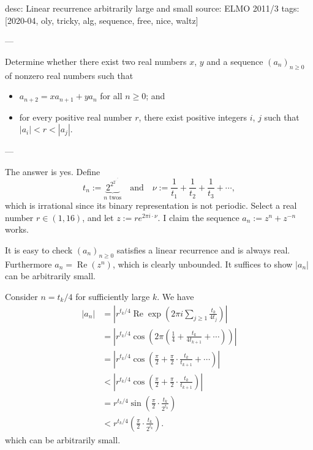 desc: Linear recurrence arbitrarily large and small
source: ELMO 2011/3
tags: [2020-04, oly, tricky, alg, sequence, free, nice, waltz]

---

Determine whether there exist two real numbers $x$, $y$ and a sequence $(a_n)_{n\ge0}$ of nonzero real numbers such that 
\begin{itemize}[itemsep=0em]
    \item $a_{n+2}=xa_{n+1}+ya_n$ for all $n\ge0$; and
    \item for every positive real number $r$, there exist positive integers $i$, $j$ such that $|a_i|<r<|a_j|$.
\end{itemize}

---

The answer is yes. Define \[t_n:=\underbrace{2^{2^{2^{\cdot^{\cdot^{\cdot^2}}}}}}_{n\text{ twos}}\quad\text{and}\quad\nu:=\frac1{t_1}+\frac1{t_2}+\frac1{t_3}+\cdots,\]
which is irrational since its binary representation is not periodic. Select a real number $r\in(1,16)$, and let $z:=re^{2\pi i\cdot\nu}$. I claim the sequence $a_n:=z^n+z^{-n}$ works.

It is easy to check $(a_n)_{n\ge0}$ satisfies a linear recurrence and is always real. Furthermore $a_n=\operatorname{Re}(z^n)$, which is clearly unbounded. It suffices to show $|a_n|$ can be arbitrarily small.

Consider $n=t_k/4$ for sufficiently large $k$. We have
\begin{align*}
    |a_n|&=\left\lvert r^{t_k/4}\operatorname{Re}\exp\left(2\pi i\sum_{j\ge1}\frac{t_k}{4t_j}\right)\right\rvert\\
    &=\left\lvert r^{t_k/4}\cos\left(2\pi\left(\frac14+\frac{t_k}{4t_{k+1}}+\cdots\right)\right)\right\rvert\\
    &=\left\lvert r^{t_k/4}\cos\left(\frac{\pi}2+\frac\pi2\cdot\frac{t_k}{t_{k+1}}+\cdots\right)\right\rvert\\
    &<\left\lvert r^{t_k/4}\cos\left(\frac{\pi}2+\frac\pi2\cdot\frac{t_k}{t_{k+1}}\right)\right\rvert\\
    &=r^{t_k/4}\sin\left(\frac\pi2\cdot\frac{t_k}{2^{t_k}}\right)\\
    &<r^{t_k/4}\left(\frac\pi2\cdot\frac{t_k}{2^{t_k}}\right).
\end{align*}
which can be arbitrarily small.
